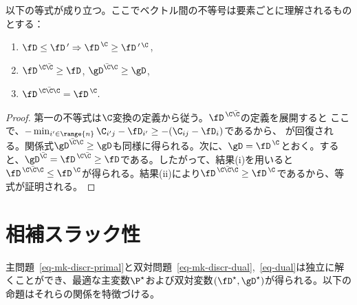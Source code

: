 \begin{prop}\label{prop-ccc-2}以下の等式が成り立つ。ここでベクトル間の不等号は要素ごとに理解されるものとする：
	\begin{enumerate}[label=(\roman*)]
	\item $\fD\leq \fD\,' \Rightarrow \fD^{\,\C}\geq \fD\,'^{\,\C}$,
	\item $\fD^{\,\C\bar{\C}} \geq \fD$, $\gD^{\bar{\C}\C} \geq \gD$,
	\item $\fD^{\,\C\bar{\C}\C}=\fD^{\,\C}.$
\end{enumerate}
\end{prop}
\begin{proof} 第一の不等式は$\C$変換の定義から従う。$\fD^{\,\C\bar{\C}}$の定義を展開すると
ここで、$-\min_{i'\in \range{n}} \C_{i'j}-\fD_{i'} \geq -(\C_{ij}-\fD_i)$であるから、
が回復される。関係式$\gD^{\bar{\C}\C} \geq \gD$も同様に得られる。次に、$\gD=\fD^{\,\C}$とおく。すると、$\gD^{\bar{\C}}=\fD^{\,\C\bar{\C}}\geq \fD$である。したがって、結果(i)を用いると$\fD^{\,\C\bar{\C}\C}\leq \fD^{\,\C}$が得られる。結果(ii)により$\fD^{\,\C\bar{\C}\C}\geq \fD^{\,\C}$であるから、等式が証明される。
\end{proof}


\section{相補スラック性}\label{s-complementary}

主問題~\eqref{eq-mk-discr-primal}と双対問題~\eqref{eq-mk-discr-dual},~\eqref{eq-dual}は独立に解くことができ、最適な主変数$\P^{\star}$および双対変数$(\fD^{\star},\gD^{\star})$が得られる。以下の命題はそれらの関係を特徴づける。

